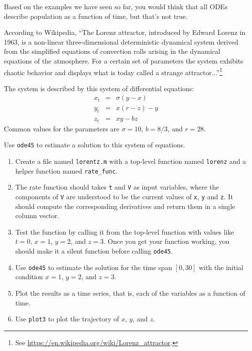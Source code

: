 \documentclass[
]{book}
\numberwithin{Answer}{chapter}
\numberwithin{Exercise}{chapter}
\begin{document}
\begin{ex}


Based on the examples we have seen so far, you would think that
all ODEs describe population as
a function of time, but that's not true.

According to Wikipedia,
``The Lorenz attractor, introduced by Edward Lorenz in 1963, is a
non-linear three-dimensional deterministic dynamical system derived
from the simplified equations of convection rolls arising in the
dynamical equations of the atmosphere. For a certain set of parameters
the system exhibits chaotic behavior and displays what is today called
a strange attractor...''\footnote{See \url{https://en.wikipedia.org/wiki/Lorenz_attractor}.}

The system is described by this system of differential equations:
%
\begin{eqnarray}
x_t &=& \sigma (y - x)  \\
y_t &=& x (r - z) - y   \\
z_t &=& xy - b z
\end{eqnarray}
%
Common values for the parameters are $\sigma = 10$, $b = 8/3$, and $r=28$.

Use {\tt ode45} to estimate a solution to this
system of equations.


\begin{enumerate}

\item Create a file named {\tt lorentz.m} with a top-level function named {\tt lorenz} and a helper function named \verb"rate_func".

\item  The rate function should
takes {\tt t} and {\tt V} as input variables, where the components
of {\tt V} are understood to be the current values of {\tt x},
{\tt y} and {\tt z}.  It should compute the corresponding derivatives
and return them in a single column vector.

\item Test the function by calling it from the top-level function with values like $t=0$, $x=1$, $y=2$, and $z=3$.  Once you get your function working, you should make it a silent function before calling {\tt ode45}.

\item Use {\tt ode45}
to estimate the solution for the time span $[0, 30]$
with the initial condition $x=1$, $y=2$, and $z=3$.

\item Plot the results as a time series, that is, each of the variables as a function of time.

\item Use {\tt plot3} to plot the trajectory of
$x$, $y$, and $z$.

\end{enumerate}

\end{ex}
\end{document}
